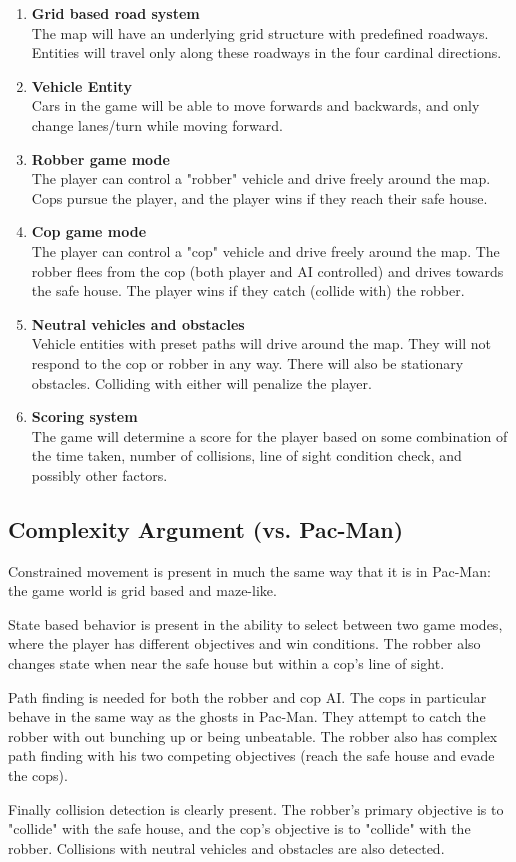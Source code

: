 \documentclass[12pt]{article}
\begin{document}
\begin{enumerate}
    \item \textbf{Grid based road system} \\
    The map will have an underlying grid structure with predefined roadways. Entities will travel only along these roadways in the four cardinal directions.
    \item \textbf{Vehicle Entity} \\
    Cars in the game will be able to move forwards and backwards, and only change lanes/turn while moving forward.
    \item \textbf{Robber game mode} \\
    The player can control a "robber" vehicle and drive freely around the map. Cops pursue the player, and the player wins if they reach their safe house.
    \item \textbf{Cop game mode} \\
    The player can control a "cop" vehicle and drive freely around the map. The robber flees from the cop (both player and AI controlled) and drives towards the safe house. The player wins if they catch (collide with) the robber.
    \item \textbf{Neutral vehicles and obstacles} \\
    Vehicle entities with preset paths will drive around the map. They will not respond to the cop or robber in any way. There will also be stationary obstacles. Colliding with either will penalize the player.
    \item \textbf{Scoring system} \\
    The game will determine a score for the player based on some combination of the time taken, number of collisions, line of sight condition check, and possibly other factors.
\end{enumerate}

\subsection*{Complexity Argument (vs. Pac-Man)}
Constrained movement is present in much the same way that it is in Pac-Man: the game world is grid based and maze-like.
\par State based behavior is present in the ability to select between two game modes, where the player has different objectives and win conditions. The robber also changes state when near the safe house but within a cop's line of sight.
\par Path finding is needed for both the robber and cop AI. The cops in particular behave in the same way as the ghosts in Pac-Man. They attempt to catch the robber with out bunching up or being unbeatable. The robber also has complex path finding with his two competing objectives (reach the safe house and evade the cops).
\par Finally collision detection is clearly present. The robber's primary objective is to "collide" with the safe house, and the cop's objective is to "collide" with the robber. Collisions with neutral vehicles and obstacles are also detected.
\end{document}
